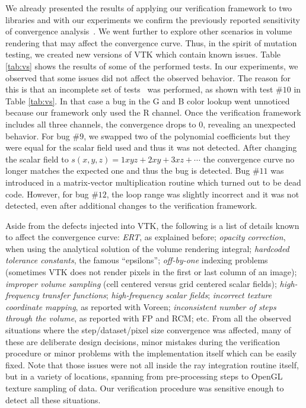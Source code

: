 We already presented the results of applying our verification
framework to two libraries and with our experiments we confirm the
previously reported sensitivity of convergence
analysis~\cite{Roy2005}. We went further to explore other scenarios in
volume rendering that may affect the convergence curve. Thus, in the
spirit of mutation testing, we created new versions of VTK which
contain known issues. Table \ref{tab:vs} shows the results of some of
the performed tests. In our experiments, we observed that some issues
did not affect the observed behavior.  The reason for this is that an
incomplete set of tests~\cite{KnuppSalari02} was performed, as shown
with test $\#10$ in Table \ref{tab:vs}. In that case a bug in the G
and B color lookup went unnoticed because our framework only used the
R channel. Once the verification framework includes all three
channels, the convergence drops to $0$, revealing an unexpected
behavior. For bug $\#9$, we swapped two of the polynomial coefficients
but they were equal for the scalar field used and thus it was not
detected. After changing the scalar field to $s(x,y,z) = 1xyz + 2xy +
3xz + \cdots$ the convergence curve no longer matches the expected one
and thus the bug is detected. Bug $\#11$ was introduced in a
matrix-vector multiplication routine which turned out to be dead
code. However, for bug $\#12$, the loop range was slightly incorrect
and it was not detected, even after additional changes to the
verification framework.

Aside from the defects injected into VTK, the following is a list of
details known to affect the convergence curve:
\emph{ERT}, as explained before;
\emph{opacity correction}, when using the analytical solution of the volume rendering integral;
\emph{hardcoded tolerance constants}, the famous ``epsilons'';
\emph{off-by-one} indexing problems (sometimes VTK does not render pixels in the first or last
column of an image);
\emph{improper volume sampling} (cell centered versus grid centered
scalar fields);
\emph{high-frequency transfer functions};
\emph{high-frequency scalar fields};
\emph{incorrect texture coordinate mapping}, as reported with Voreen;
\emph{inconsistent number of steps through the volume}, as reported
with FP and RCM; etc. %
From all the observed situations where the step/dataset/pixel size
convergence was affected, many of these are deliberate design
decisions, minor mistakes during the verification procedure or minor
problems with the implementation itself which can be easily fixed.
%
Note that those issues were not all inside the ray integration routine
itself, but in a variety of locations, spanning from pre-processing
steps to OpenGL texture sampling of data.
Our verification procedure was sensitive enough to detect all these
situations. 

